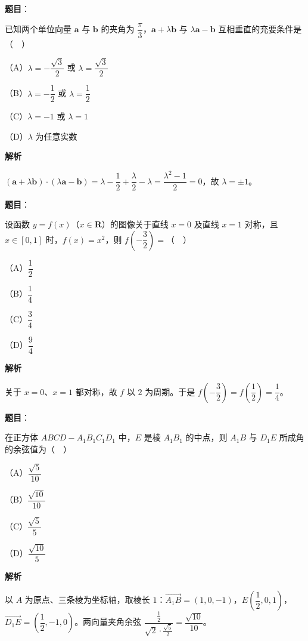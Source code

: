 \begin{answer}

\textbf{题目}：

已知两个单位向量 $\boldsymbol a$ 与 $\boldsymbol b$ 的夹角为 $\dfrac{\pi}3$，$\boldsymbol a+\lambda\boldsymbol b$ 与 $\lambda\boldsymbol a-\boldsymbol b$ 互相垂直的充要条件是（　）

（A）$\lambda=-\dfrac{\sqrt3}2$ 或 $\lambda=\dfrac{\sqrt3}2$

（B）$\lambda=-\dfrac12$ 或 $\lambda=\dfrac12$

（C）$\lambda=-1$ 或 $\lambda=1$

（D）$\lambda$ 为任意实数

\textbf{解析}

$(\boldsymbol a+\lambda\boldsymbol b)\cdot(\lambda\boldsymbol a-\boldsymbol b)=\lambda-\dfrac12+\dfrac\lambda2-\lambda=\dfrac{\lambda^2-1}2=0$，故 $\lambda=\pm1$。


\end{answer}
\begin{answer}

\textbf{题目}：

设函数 $y=f(x)$（$x\in\mathbf R$）的图像关于直线 $x=0$ 及直线 $x=1$ 对称，且 $x\in[0,1]$ 时，$f(x)=x^2$，则 $f\left(-\dfrac32\right)=$（　）

（A）$\dfrac12$

（B）$\dfrac14$

（C）$\dfrac34$

（D）$\dfrac94$

\textbf{解析}

关于 $x=0$、$x=1$ 都对称，故 $f$ 以 $2$ 为周期。于是 $f\left(-\dfrac32\right)=f\left(\dfrac12\right)=\dfrac14$。


\end{answer}
\begin{answer}

\textbf{题目}：

在正方体 $ABCD-A_1B_1C_1D_1$ 中，$E$ 是棱 $A_1B_1$ 的中点，则 $A_1B$ 与 $D_1E$ 所成角的余弦值为（　）

（A）$\dfrac{\sqrt5}{10}$

（B）$\dfrac{\sqrt{10}}{10}$

（C）$\dfrac{\sqrt5}5$

（D）$\dfrac{\sqrt{10}}5$

\textbf{解析}

以 $A$ 为原点、三条棱为坐标轴，取棱长 $1$：$\overrightarrow{A_1B}=(1,0,-1)$，$E\left(\dfrac12,0,1\right)$，$\overrightarrow{D_1E}=\left(\dfrac12,-1,0\right)$。两向量夹角余弦 $\dfrac{\frac12}{\sqrt2\cdot\frac{\sqrt5}2}=\dfrac{\sqrt{10}}{10}$。


\end{answer}
